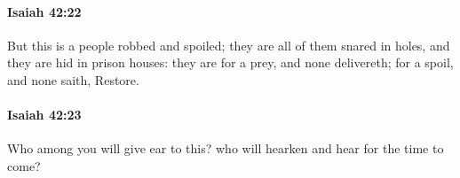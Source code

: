 		\paragraph{Isaiah 42:22} %
			\label{ISAIAH-42-22}

			But this is a people robbed and spoiled; they are all of them snared in holes, and they are hid in prison houses: they are for a prey, and none delivereth; for a spoil, and none saith, Restore.


		\paragraph{Isaiah 42:23} %
			\label{ISAIAH-42-23}

			Who among you will give ear to this? who will hearken and hear for the time to come?


